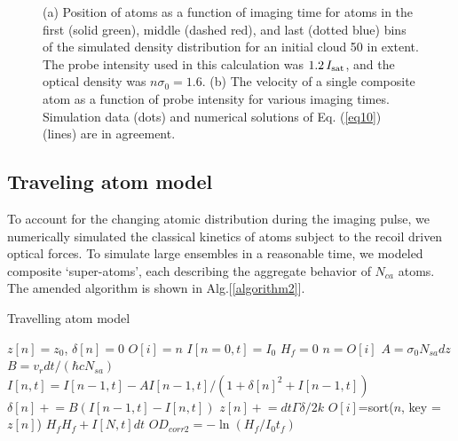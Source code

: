 \documentclass[12pt]{iopart}
\begin{document}
\begin{figure}
\caption{(a) Position of atoms as a function of imaging time for atoms in the first (solid green), middle (dashed red), and last (dotted blue) bins of the simulated density distribution for an initial cloud 50 \um{} in extent. The probe intensity used in this calculation was $1.2\, I_{\rm{sat}}$, and the optical density was $n\sigma_0=1.6$. (b) The velocity of a single composite atom as a function of probe intensity for various imaging times. Simulation data (dots) and numerical  solutions of Eq. (\ref{eq10}) (lines) are in agreement.}  
\label{fig:simTests}
\end{figure}

\subsection{Traveling atom model}
To account for the changing atomic distribution during the imaging pulse, we numerically simulated the classical kinetics of atoms subject to the recoil driven optical forces. To simulate large ensembles in a reasonable time, we modeled composite `super-atoms', each describing the aggregate behavior of $N_{ca}$ atoms. The amended algorithm is shown in Alg.[\ref{algorithm2}]. 
\begin{algorithm}
\caption{Travelling atom model}
\label{algorithm2}
\begin{algorithmic}
\STATE $z[n]=z_0$, $\delta[n]=0$ 
\STATE $O[i]=n$ 
\STATE $I[n=0,t]=I_0$  
\STATE $H_f=0$ 
\STATE $n=O[i]$ 
 \STATE $A=\sigma_0 N_{sa} dz$ 
 \STATE $B=v_r dt/(\hbar c  N_{sa})$  
\STATE $I[n,t]=I[n-1,t] - A I[n-1,t]/(1+\delta[n]^2+I[n-1,t])$  
\STATE $\delta[n]\mathrel{+}=B\left(I[n-1,t]-I[n,t]\right)$   
\STATE $z[n]\mathrel{+}=dt\Gamma\delta/2k$ 
\ENDFOR 
\STATE $O[i]$=sort($n$, key =$z[n]$) 
\STATE $H_f H_f+ I[N,t]dt$ 
\ENDFOR
\STATE $OD_{corr2}=-\ln{(H_f/I_0t_f)}$
\end{algorithmic}
\end{algorithm}
\end{document}
